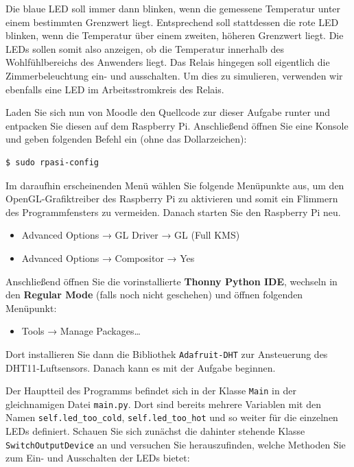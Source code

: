 Die blaue LED soll immer dann blinken, wenn die gemessene Temperatur unter
einem bestimmten Grenzwert liegt. Entsprechend soll stattdessen die rote LED
blinken, wenn die Temperatur über einem zweiten, höheren Grenzwert liegt.
Die LEDs sollen somit also anzeigen, ob die Temperatur innerhalb des
\glqq{}Wohlfühlbereichs\grqq{} des Anwenders liegt. \smiley{} Das Relais hingegen
soll eigentlich die Zimmerbeleuchtung ein- und ausschalten. Um dies zu simulieren,
verwenden wir ebenfalls eine LED im Arbeitsstromkreis des Relais.

\bigskip
\teilaufgabe
Laden Sie sich nun von Moodle den Quellcode zur dieser Aufgabe runter und
entpacken Sie diesen auf dem Raspberry Pi. Anschließend öffnen Sie eine Konsole
und geben folgenden Befehl ein (ohne das Dollarzeichen):

\begin{verbatim}
$ sudo rpasi-config
\end{verbatim}

Im daraufhin erscheinenden Menü wählen Sie folgende Menüpunkte aus, um den
OpenGL-Grafiktreiber des Raspberry Pi zu aktivieren und somit ein Flimmern des
Programmfensters zu vermeiden. Danach starten Sie den Raspberry Pi neu.

\begin{itemize}
    \item Advanced Options → GL Driver → GL (Full KMS)
    \item Advanced Options → Compositor → Yes
\end{itemize}

Anschließend öffnen Sie die vorinstallierte \textbf{Thonny Python IDE},
wechseln in den \textbf{Regular Mode} (falls noch nicht geschehen) und öffnen
folgenden Menüpunkt:

\begin{itemize}
    \item Tools → Manage Packages…
\end{itemize}

Dort installieren Sie dann die Bibliothek \texttt{Adafruit-DHT} zur Ansteuerung
des DHT11-Luftsensors. Danach kann es mit der Aufgabe beginnen.

\bigskip
\teilaufgabe
Der Hauptteil des Programms befindet sich in der Klasse \texttt{Main} in der
gleichnamigen Datei \texttt{main.py}. Dort sind bereits mehrere Variablen mit
den Namen \texttt{self\-.led\_\-too\_\-cold}, \texttt{self\-.led\_\-too\_\-hot}
und so weiter für die einzelnen LEDs definiert. Schauen Sie sich zunächst die
dahinter stehende Klasse \texttt{Switch\-Output\-Device} an und versuchen Sie
herauszufinden, welche Methoden Sie zum Ein- und Ausschalten der LEDs bietet:

